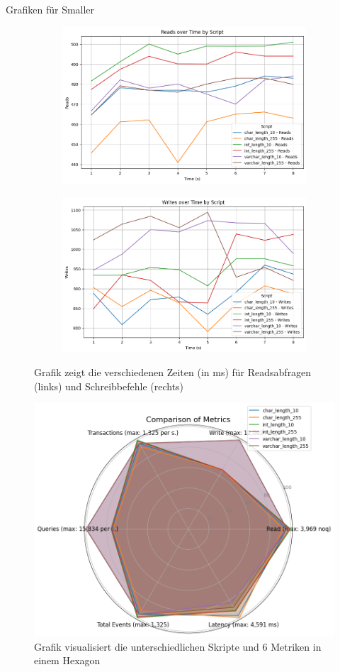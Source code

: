 Grafiken für Smaller
\begin{figure}[!ht]
    \centering
    \begin{subfigure}[t]{0.48\textwidth}
        \centering
        \includegraphics[width=\textwidth]{PNGs/Data_Types/Smaller/Reads}
        \label{data-types-smaller-reads}
    \end{subfigure}
    \hfill
    \begin{subfigure}[t]{0.48\textwidth}
        \centering
        \includegraphics[width=\textwidth]{PNGs/Data_Types/Smaller/Writes}
        \label{data-types-smaller-writes}
    \end{subfigure}
    \caption[Data-Types-Smaller: Reads und Writes]{Grafik zeigt die verschiedenen Zeiten (in ms) für Readsabfragen (links) und Schreibbefehle (rechts)}
    \label{fig:data-types-smaller-measures}
\end{figure}

\begin{figure}[!ht]
    \centering
    \includegraphics[width=.6\textwidth]{PNGs/Data_Types/Smaller/statistics}
    \caption[Data-Types-Smaller: Statistiken]{Grafik visualisiert die unterschiedlichen Skripte und 6 Metriken in einem Hexagon}
    \label{fig:data-types-smaller-statistics}
\end{figure}